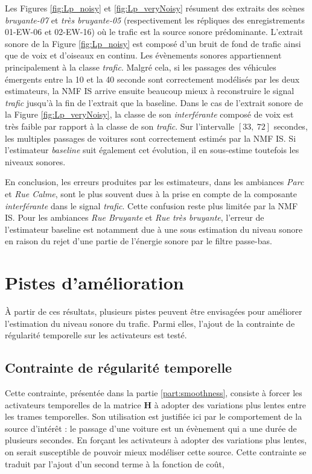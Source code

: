 Les Figures \ref{fig:Lp_noisy} et \ref{fig:Lp_veryNoisy} résument des extraits des scènes \textit{bruyante-07} et \textit{très bruyante-05} (respectivement les répliques des enregistrements 01-EW-06 et 02-EW-16) où le trafic est la source sonore prédominante. L'extrait sonore de la Figure \ref{fig:Lp_noisy} est composé d'un bruit de fond de trafic ainsi que de voix et d'oiseaux en continu. Les évènements sonores appartiennent principalement à la classe \textit{trafic}. Malgré cela, si les passages des véhicules émergents entre la 10\ieme{} et la 40\ieme{} seconde sont correctement modélisés par les deux estimateurs, la NMF IS arrive ensuite beaucoup mieux à reconstruire le signal \textit{trafic} jusqu'à la fin de l'extrait que la baseline. Dans le cas de l'extrait sonore de la Figure \ref{fig:Lp_veryNoisy}, la classe de son \textit{interférante} composé de voix est très faible par rapport à la classe de son \textit{trafic}. Sur l'intervalle $\left[ 33,~72 \right]$ secondes, les multiples passages de voitures sont correctement estimés par la NMF IS. Si l'estimateur \textit{baseline} suit également cet évolution, il en sous-estime toutefois les niveaux sonores.

En conclusion, les erreurs produites par les estimateurs, dans les ambiances \textit{Parc} et \textit{Rue Calme}, sont le plus souvent dues à la prise en compte de la composante \textit{interférante} dans le signal \textit{trafic}. Cette confusion reste plus limitée par la NMF IS. Pour les ambiances \textit{Rue Bruyante} et \textit{Rue très bruyante}, l'erreur de l'estimateur baseline est notamment due à une sous estimation du niveau sonore en raison du rejet d'une partie de l'énergie sonore par le filtre passe-bas. 

\section{Pistes d'amélioration}

\`A partir de ces résultats, plusieurs pistes peuvent être envisagées pour améliorer l'estimation du niveau sonore du trafic. Parmi elles, l'ajout de la contrainte de régularité temporelle sur les activateurs est testé.

\subsection{Contrainte de régularité temporelle}

Cette contrainte, présentée dans la partie \ref{part:smoothness}, consiste à forcer les activateurs temporelles de la matrice $\mathbf{H}$ à adopter des variations plus lentes entre les trames temporelles. Son utilisation est justifiée ici par le comportement de la source d'intérêt : le passage d'une voiture est un évènement qui a une durée de plusieurs secondes. En forçant les activateurs à adopter des variations plus lentes, on serait susceptible de pouvoir mieux modéliser cette source. Cette contrainte se traduit par l'ajout d'un second terme à la fonction de coût, 


